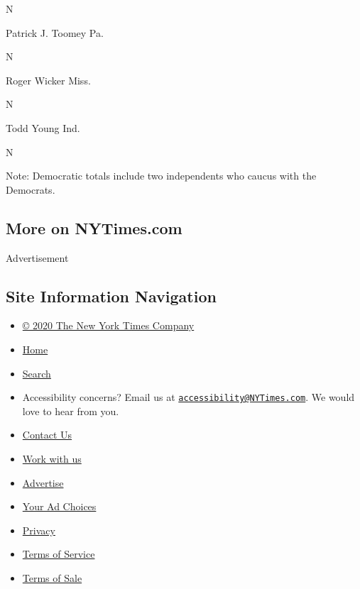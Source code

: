 N

Patrick J. Toomey Pa.

N

Roger Wicker Miss.

N

Todd Young Ind.

N

Note: Democratic totals include two independents who caucus with the
Democrats.

\hypertarget{more-on-nytimescom}{%
\subsection{More on NYTimes.com}\label{more-on-nytimescom}}

Advertisement

\hypertarget{site-information-navigation}{%
\subsection{Site Information
Navigation}\label{site-information-navigation}}

\begin{itemize}
\tightlist
\item
  \href{https://help.nytimes3xbfgragh.onion/hc/en-us/articles/115014792127-Copyright-notice}{©
  2020 The New York Times Company}
\item
  \href{https://www.nytimes3xbfgragh.onion}{Home}
\item
  \href{https://www.nytimes3xbfgragh.onion/search/}{Search}
\item
  Accessibility concerns? Email us at
  \href{mailto:accessibility@NYTimes.com}{\nolinkurl{accessibility@NYTimes.com}}.
  We would love to hear from you.
\item
  \href{https://help.nytimes3xbfgragh.onion/hc/en-us/articles/115015385887-Contact-Us}{Contact
  Us}
\item
  \href{https://www.nytco.com/careers/}{Work with us}
\item
  \href{https://nytmediakit.com/}{Advertise}
\item
  \href{https://help.nytimes3xbfgragh.onion/hc/en-us/articles/115014892108-Privacy-policy\#pp}{Your
  Ad Choices}
\item
  \href{https://help.nytimes3xbfgragh.onion/hc/en-us/articles/115014892108-Privacy-policy}{Privacy}
\item
  \href{https://help.nytimes3xbfgragh.onion/hc/en-us/articles/115014893428-Terms-of-service}{Terms
  of Service}
\item
  \href{https://help.nytimes3xbfgragh.onion/hc/en-us/articles/115014893968-Terms-of-sale}{Terms
  of Sale}
\end{itemize}

